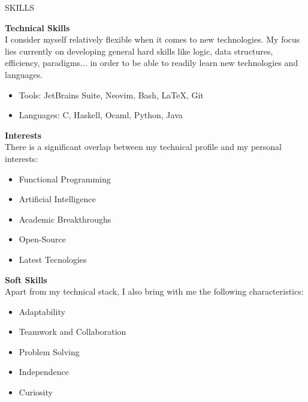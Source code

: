 \documentclass [10pt, a4paper] {extarticle}
\newcommand{\sectionlinethickness}{
    1.3 pt
}
\newcommand{\leftcolumwidth}{
    0.18
}
\newcommand{\rightcolumwidth}{
    0.82
}
\newcommand {\sectiontitle}[1] {
    \begin {flushleft}
    \begin {minipage}[c]{\leftcolumwidth\textwidth}
        \begin {flushright}
        \!\MakeUppercase {#1}
        \hspace* {10px}
        \end {flushright}
    \end {minipage}
        \begin {tikzpicture}
            \hspace{-4px}
            \draw [line width=\sectionlinethickness, namelines] (1,0) -- (15.363,0);
        \end {tikzpicture}
    \end {flushleft}
}
\begin{document}

    \sectiontitle {skills}

    \begin {flushright}
    \begin {minipage} [t] {\rightcolumwidth\textwidth}

        \textbf {Technical Skills} \\ [4px]
        I consider myself relatively flexible when it comes to new technologies. My focus lies currently on developing general hard skills like logic, data structures, efficiency, paradigms... in order to be able to readily learn new technologies and languages.
        \vspace {-2px}
        \begin {itemize} [noitemsep]
            \item Tools: JetBrains Suite, Neovim, Bash, LaTeX, Git
            \item Languages: C, Haskell, Ocaml, Python, Java
        \end {itemize}

        \begin {minipage} [t] {0.475\textwidth}
            \textbf {Interests} \\ [4px]
            There is a significant overlap between my technical profile and my personal interests:
            \vspace {-2px}
            \begin {itemize} [noitemsep]
                \item Functional Programming
                \item Artificial Intelligence
                \item Academic Breakthroughs
                \item Open-Source
                \item Latest Tecnologies
            \end {itemize}
        \end {minipage}
        \hfill
        \begin {minipage} [t] {0.475\textwidth}
            \textbf {Soft Skills} \\ [4px]
            Apart from my technical stack, I also bring with me the following characteristics:
            \vspace {-2px}
            \begin {itemize} [noitemsep]
                \item Adaptability
                \item Teamwork and Collaboration
                \item Problem Solving
                \item Independence
                \item Curiosity
            \end {itemize}
        \end {minipage}
    \end {minipage}
    \end {flushright}
\end{document}
